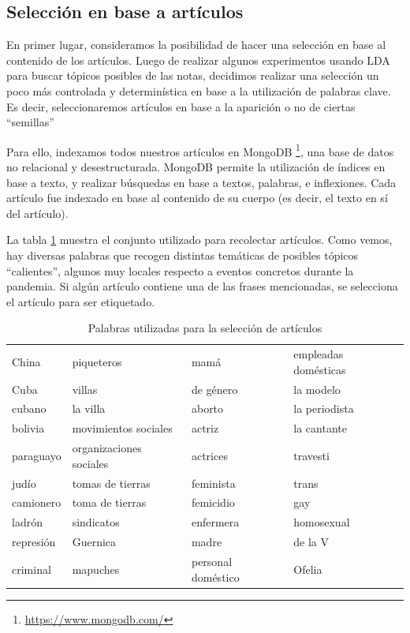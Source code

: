 \subsection{Selección en base a artículos}

En primer lugar, consideramos la posibilidad de hacer una selección en base al contenido de los artículos. Luego de realizar algunos experimentos usando LDA \cite{blei2003latent} para buscar tópicos posibles de las notas, decidimos realizar una selección un poco más controlada y determinística en base a la utilización de palabras clave. Es decir, seleccionaremos artículos en base a la aparición o no de ciertas ``semillas''

Para ello, indexamos todos nuestros artículos en MongoDB \footnote{\url{https://www.mongodb.com/}}, una base de datos no relacional y desestructurada. MongoDB permite la utilización de índices en base a texto, y realizar búsquedas en base a textos, palabras, e inflexiones. Cada artículo fue indexado en base al contenido de su cuerpo (es decir, el texto en sí del artículo).

La tabla \ref{tab:palabras_articulos} muestra el conjunto utilizado para recolectar artículos. Como vemos, hay diversas palabras que recogen distintas temáticas de posibles tópicos ``calientes'', algunos muy locales respecto a eventos concretos durante la pandemia. Si algún artículo contiene una de las frases mencionadas, se selecciona el artículo para ser etiquetado.

\begin{table}[]
    \centering
    \begin{tabular}{l | l | l | l}
    China        &  piqueteros              &  mamá                & empleadas domésticas  \\
    Cuba         &  villas                  &  de género           & la modelo             \\
    cubano       &  la villa                &  aborto              & la periodista         \\
    bolivia      &  movimientos sociales    &  actriz              & la cantante           \\
    paraguayo    &  organizaciones sociales &  actrices            & travesti              \\
    judío        &  tomas de tierras        &  feminista           & trans                 \\
    camionero    &  toma de tierras         &  femicidio           & gay                   \\
    ladrón       &  sindicatos              &  enfermera           & homosexual            \\
    represión    &  Guernica                &  madre               & de la V               \\
    criminal     &  mapuches                &  personal doméstico  & Ofelia                \\
    \end{tabular}
    \caption{Palabras utilizadas para la selección de artículos}
    \label{tab:palabras_articulos}
\end{table}

